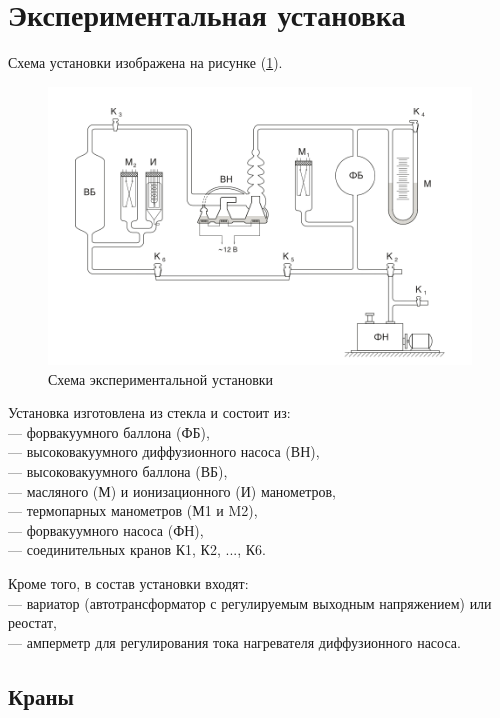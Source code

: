 \documentclass[a4paper,12pt]{article} %
\begin{document}
\section*{Экспериментальная установка}

Схема установки изображена на рисунке (\ref{fig:dr1}). 

\medskip

\begin{figure}[h]
  \centering
  \includegraphics[scale = 0.75]{images/dr1.png}
  \caption{Схема экспериментальной установки}
  \label{fig:dr1}
\end{figure}

Установка изготовлена из стекла и состоит из: \\ 
— форвакуумного баллона (ФБ), \\ 
— высоковакуумного диффузионного насоса (ВН), \\ 
— высоковакуумного баллона (ВБ), \\ 
— масляного (М) и ионизационного (И) манометров, \\ 
— термопарных манометров (М1 и M2), \\ 
— форвакуумного насоса (ФН), \\ 
— соединительных кранов К1, К2, ..., К6. 

Кроме того, в состав установки входят: \\ 
— вариатор (автотрансформатор с регулируемым выходным напряжением) или реостат, \\ 
— амперметр для регулирования тока нагревателя диффузионного насоса.

\subsection*{Краны}
\end{document}
